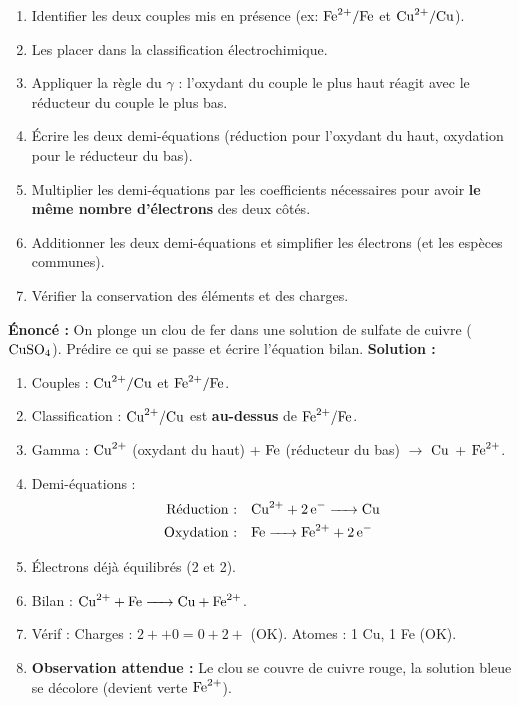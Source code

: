 \documentclass[11pt]{article}
\begin{document}
\begin{methode}
\begin{enumerate}
  \item Identifier les deux couples mis en présence (ex: $\ce{Fe^2+}/\ce{Fe}$ et $\ce{Cu^2+}/\ce{Cu}$).
  \item Les placer dans la classification électrochimique.
  \item Appliquer la règle du $\gamma$ : l'oxydant du couple le plus haut réagit avec le réducteur du couple le plus bas.
  \item Écrire les deux demi-équations (réduction pour l'oxydant du haut, oxydation pour le réducteur du bas).
  \item Multiplier les demi-équations par les coefficients nécessaires pour avoir \textbf{le même nombre d'électrons} des deux côtés.
  \item Additionner les deux demi-équations et simplifier les électrons (et les espèces communes).
  \item Vérifier la conservation des éléments et des charges.
\end{enumerate}
\end{methode}

\begin{exoresolu}
\textbf{Énoncé :} On plonge un clou de fer dans une solution de sulfate de cuivre ($\ce{CuSO4}$). Prédire ce qui se passe et écrire l'équation bilan.
\tcblower
\textbf{Solution :}
\begin{enumerate}
  \item Couples : $\ce{Cu^2+}/\ce{Cu}$ et $\ce{Fe^2+}/\ce{Fe}$.
  \item Classification : $\ce{Cu^2+}/\ce{Cu}$ est \textbf{au-dessus} de $\ce{Fe^2+}/\ce{Fe}$.
  \item Gamma : $\ce{Cu^2+}$ (oxydant du haut) + $\ce{Fe}$ (réducteur du bas) $\to$ $\ce{Cu}$ + $\ce{Fe^2+}$.
  \item Demi-équations :
  \begin{align*}
    \text{Réduction :} &\quad \ce{Cu^2+ + 2e- -> Cu} \\
    \text{Oxydation :} &\quad \ce{Fe -> Fe^2+ + 2e-}
  \end{align*}
  \item Électrons déjà équilibrés (2 et 2).
  \item Bilan : $\ce{Cu^2+ + Fe -> Cu + Fe^2+}$.
  \item Vérif : Charges : $2+ + 0 = 0 + 2+$ (OK). Atomes : 1 Cu, 1 Fe (OK).
  \item \textbf{Observation attendue :} Le clou se couvre de cuivre rouge, la solution bleue se décolore (devient verte $\ce{Fe^2+}$).
\end{enumerate}
\end{exoresolu}
\end{document}
